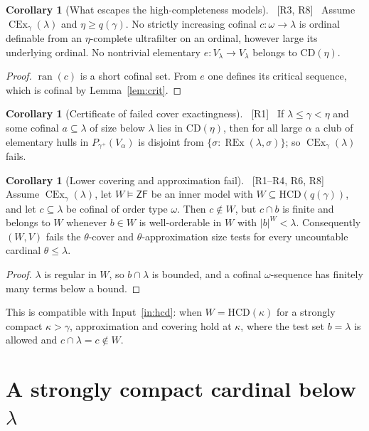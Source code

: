 \documentclass[11pt,letterpaper]{article}
\theoremstyle{definition}
\newtheorem{corollary}[definition]{Corollary}
\numberwithin{equation}{section}
\newcommand{\ZF}{\mathsf{ZF}}
\newcommand{\CD}{\mathrm{CD}}
\newcommand{\HCD}{\mathrm{HCD}}
\newcommand{\CEx}{\operatorname{CEx}}
\newcommand{\REx}{\operatorname{REx}}
\newcommand{\ran}{\operatorname{ran}}
\newcommand{\src}[1]{\unskip\ {\normalfont\small\sffamily\color{Olive}[#1]}\ }
\begin{document}
\begin{corollary}[What escapes the high-completeness models]\label{cor:escape}\src{R3, R8}
Assume $\CEx_\gamma(\lambda)$ and $\eta\ge q(\gamma)$. No strictly increasing cofinal $c:\omega\to\lambda$ is ordinal definable from an $\eta$-complete ultrafilter on an ordinal, however large its underlying ordinal. No nontrivial elementary $e:V_\lambda\to V_\lambda$ belongs to $\CD(\eta)$.
\end{corollary}

\begin{proof}
$\ran(c)$ is a short cofinal set. From $e$ one defines its critical sequence, which is cofinal by Lemma~\ref{lem:crit}.
\end{proof}

\begin{corollary}[Certificate of failed cover exactingness]\label{cor:cert}\src{R1}
If $\lambda\le\gamma<\eta$ and some cofinal $a\subseteq\lambda$ of size below $\lambda$ lies in $\CD(\eta)$, then for all large $\alpha$ a club of elementary hulls in $P_{\gamma^+}(V_\alpha)$ is disjoint from $\{\sigma:\REx(\lambda,\sigma)\}$; so $\CEx_\gamma(\lambda)$ fails.
\end{corollary}

\begin{corollary}[Lower covering and approximation fail]\label{cor:approx}\src{R1--R4, R6, R8}
Assume $\CEx_\gamma(\lambda)$, let $W\models\ZF$ be an inner model with $W\subseteq\HCD(q(\gamma))$, and let $c\subseteq\lambda$ be cofinal of order type $\omega$. Then $c\notin W$, but $c\cap b$ is finite and belongs to $W$ whenever $b\in W$ is well-orderable in $W$ with $|b|^W<\lambda$. Consequently $(W,V)$ fails the $\theta$-cover and $\theta$-approximation size tests for every uncountable cardinal $\theta\le\lambda$.
\end{corollary}

\begin{proof}
$\lambda$ is regular in $W$, so $b\cap\lambda$ is bounded, and a cofinal $\omega$-sequence has finitely many terms below a bound.
\end{proof}

This is compatible with Input~\ref{in:hcd}: when $W=\HCD(\kappa)$ for a strongly compact $\kappa>\gamma$, approximation and covering hold at $\kappa$, where the test set $b=\lambda$ is allowed and $c\cap\lambda=c\notin W$.

\section{A strongly compact cardinal below \texorpdfstring{$\lambda$}{lambda}}\label{sec:below}
\end{document}
